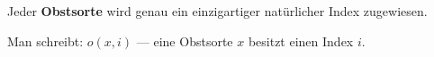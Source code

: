 \begin{axiom}\label{ax:obstsorte-index}
Jeder \textbf{Obstsorte} wird genau ein einzigartiger natürlicher Index zugewiesen.

Man schreibt: $o(x, i)$ --- eine Obstsorte $x$ besitzt einen Index $i$.
\end{axiom}
